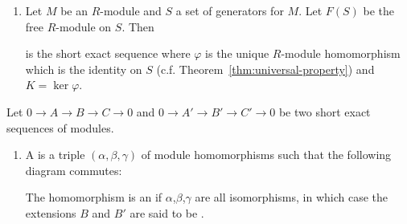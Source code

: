 \begin{example}
\begin{enumerate}[label = (\arabic*)]
            \item Let $M$ be an $R$-module and $S$ a set of generators for $M$. Let $F(S)$ be the free $R$-module on $S$. Then
                \begin{center}
                \end{center}
            is the short exact sequence where $\varphi$ is the unique $R$-module homomorphism which is the identity on $S$ (c.f. Theorem~\ref{thm:universal-property}) and $K = \ker{\varphi}$.
        \end{enumerate}

        \begin{definition}
            Let $0 \rightarrow A \rightarrow B \rightarrow C \rightarrow 0$ and $0 \rightarrow A' \rightarrow B' \rightarrow C' \rightarrow 0$ be two short exact sequences of modules.
                \begin{enumerate}[label = (\arabic*)]
                    \item A  is a triple $(\alpha , \beta , \gamma)$ of module homomorphisms such that the following diagram commutes:
                        \begin{center}
                        \end{center}
                    The homomorphism is an  if $\alpha$,$\beta$,$\gamma$ are all isomorphisms, in which case the extensions $B$ and $B'$ are said to be .
                \end{enumerate}
        \end{definition}
    \end{example}